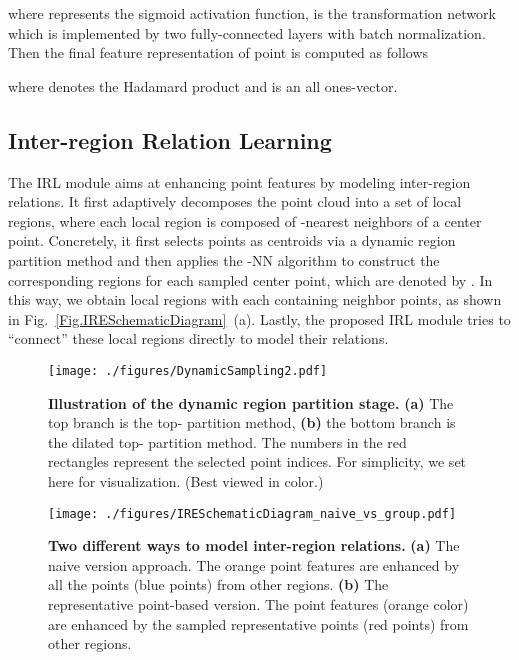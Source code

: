 \documentclass[journal]{IEEEtran}
\begin{document}
where  represents the sigmoid activation function,  is the transformation network which is implemented by two fully-connected layers with batch normalization. 
Then the final feature representation  of point  is computed as follows


where  denotes the Hadamard product and  is an all ones-vector.

\subsection{Inter-region Relation Learning}

The IRL module aims at enhancing point features by modeling inter-region relations. It first adaptively decomposes the point cloud into a set of local regions, where each local region is composed of -nearest neighbors of a center point. 
Concretely, it first selects  points  as centroids via a dynamic region partition method and then applies the -NN algorithm to construct the corresponding regions for each sampled center point, which are denoted by
. In this way, we obtain  local regions with each containing  neighbor points, as shown in Fig.~\ref{Fig.IRESchematicDiagram}~(a). 
Lastly, the proposed IRL module tries to ``connect'' these local regions directly to model their relations. 

\begin{figure}
\begin{center}
    \texttt{[image: ./figures/DynamicSampling2.pdf]}
\end{center}
\caption{\textbf{Illustration of the dynamic region partition stage.} \textbf{(a)} The top branch is the top- partition method, \textbf{(b)} the bottom branch is the dilated top- partition method. The numbers in the red rectangles represent the selected point indices. For simplicity, we set  here for visualization. (Best viewed in color.)}
\label{Fig.DynamicSampling}
\end{figure}


\begin{figure}
\begin{center}
    \texttt{[image: ./figures/IRESchematicDiagram\_naive\_vs\_group.pdf]}
\end{center}
\caption{\textbf{Two different ways to model inter-region relations.} \textbf{(a)} The naive version approach. The orange point features are enhanced by all the points (blue points) from other regions. \textbf{(b)} The representative point-based version. The point features (orange color) are enhanced by the sampled representative points (red points) from other regions.}
\label{Fig.naive}
\end{figure}
\end{document}

